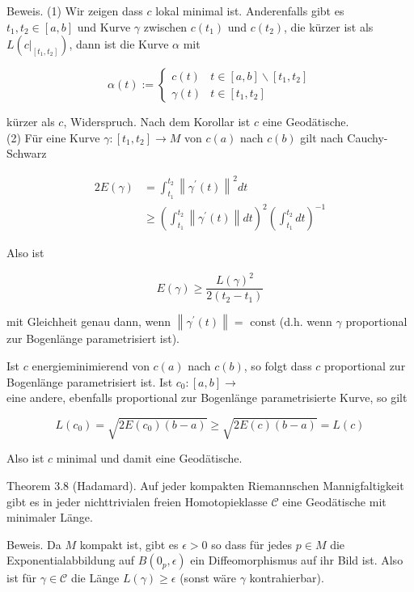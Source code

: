 \documentclass[10pt]{article}
\begin{document}
Beweis. (1) Wir zeigen dass $c$ lokal minimal ist. Anderenfalls gibt es $t_{1}, t_{2} \in[a, b]$ und Kurve $\gamma$ zwischen $c\left(t_{1}\right)$ und $c\left(t_{2}\right)$, die kürzer ist als $L\left(\left.c\right|_{\left[t_{1}, t_{2}\right]}\right)$, dann ist die Kurve $\alpha$ mit

$$
\alpha(t):=\left\{\begin{array}{cc}
c(t) & t \in[a, b] \backslash\left[t_{1}, t_{2}\right] \\
\gamma(t) & t \in\left[t_{1}, t_{2}\right]
\end{array}\right.
$$

kürzer als $c$, Widerspruch. Nach dem Korollar ist $c$ eine Geodätische.\\
(2) Für eine Kurve $\gamma:\left[t_{1}, t_{2}\right] \rightarrow M$ von $c(a)$ nach $c(b)$ gilt nach Cauchy-Schwarz

$$
\begin{aligned}
2 E(\gamma) & =\int_{t_{1}}^{t_{2}}\left\|\gamma^{\prime}(t)\right\|^{2} d t \\
& \geq\left(\int_{t_{1}}^{t_{2}}\left\|\gamma^{\prime}(t)\right\| d t\right)^{2}\left(\int_{t_{1}}^{t_{2}} d t\right)^{-1}
\end{aligned}
$$

Also ist

$$
E(\gamma) \geq \frac{L(\gamma)^{2}}{2\left(t_{2}-t_{1}\right)}
$$

mit Gleichheit genau dann, wenn $\left\|\gamma^{\prime}(t)\right\|=$ const (d.h. wenn $\gamma$ proportional zur Bogenlänge parametrisiert ist).

Ist $c$ energieminimierend von $c(a)$ nach $c(b)$, so folgt dass $c$ proportional zur Bogenlänge parametrisiert ist. Ist $c_{0}:[a, b] \rightarrow$\\
eine andere, ebenfalls proportional zur Bogenlänge parametrisierte Kurve, so gilt

$$
L\left(c_{0}\right)=\sqrt{2 E\left(c_{0}\right)(b-a)} \geq \sqrt{2 E(c)(b-a)}=L(c)
$$

Also ist $c$ minimal und damit eine Geodätische.

Theorem 3.8 (Hadamard). Auf jeder kompakten Riemannschen Mannigfaltigkeit gibt es in jeder nichttrivialen freien Homotopieklasse $\mathcal{C}$ eine Geodätische mit minimaler Länge.

Beweis. Da $M$ kompakt ist, gibt es $\epsilon>0$ so dass für jedes $p \in M$ die Exponentialabbildung auf $B\left(0_{p}, \epsilon\right)$ ein Diffeomorphismus auf ihr Bild ist. Also ist für $\gamma \in \mathcal{C}$ die Länge $L(\gamma) \geq \epsilon$ (sonst wäre $\gamma$ kontrahierbar).
\end{document}
